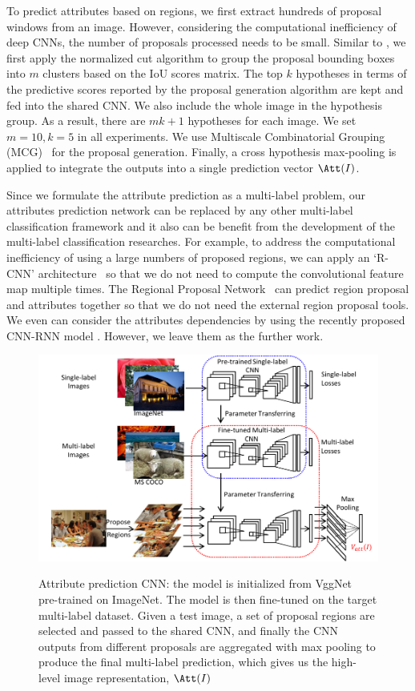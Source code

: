 To predict attributes based on regions, we first extract hundreds of proposal windows from an image. However, considering the computational inefficiency of deep CNNs, the number of proposals processed needs to be small. Similar to \cite{wei2014cnn}, we first apply the normalized cut algorithm to group the proposal bounding boxes into $m$ clusters based on the IoU scores matrix. The top $k$ hypotheses in terms of the predictive scores reported by the proposal generation algorithm are kept and fed into the shared CNN. We also include the whole image in the hypothesis group. As a result, there are $mk+1$ hypotheses for each image. We set $m=10, k=5$ in all experiments. We use Multiscale Combinatorial Grouping (MCG)~\cite{PABMM2015} for the proposal generation. Finally, a cross hypothesis max-pooling is applied to integrate the outputs into a single prediction vector $\Att(I)$.

Since we formulate the attribute prediction as a multi-label problem, our attributes prediction network can be replaced by any other multi-label classification framework and it also can be benefit from the development of the multi-label classification researches. For example, to address the computational inefficiency of using a large numbers of proposed regions, we can apply an `R-CNN' architecture~\cite{girshick2015fast} so that we do not need to compute the convolutional feature map multiple times. The Regional Proposal Network~\cite{ren2015faster} can predict region proposal and attributes together so that we do not need the external region proposal tools. We even can consider the attributes dependencies by using the recently proposed CNN-RNN model \cite{wang2016cnn}. However, we leave them as the further work.

\begin{figure}[t!]
  \centering
  \includegraphics[width=1\linewidth]{./img/attributes_layer.pdf}\\
  \caption{Attribute prediction CNN: the model is initialized from VggNet~\cite{simonyan2014very} pre-trained on ImageNet. The model is then fine-tuned on the target multi-label dataset. Given a test image, a set of proposal regions are selected and passed to the shared CNN, and finally the CNN outputs from different proposals are aggregated with max pooling to produce the final multi-label prediction, which gives us the high-level image representation, $\Att(I)$}
  \label{img:attributes}
  \vspace{-10pt}
\end{figure}

